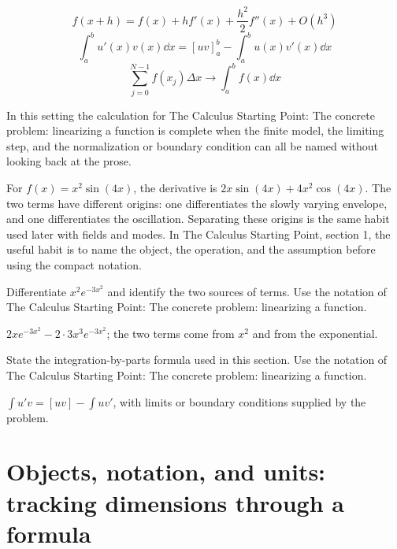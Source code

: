 \[
  f(x+h)=f(x)+hf'(x)+\frac{h^2}{2}f''(x)+O(h^3)
\]
\[
  \int_a^b u'(x)v(x)\dd x=[uv]_a^b-\int_a^b u(x)v'(x)\dd x
\]
\[
  \sum_{j=0}^{N-1}f(x_j)\Delta x\longrightarrow \int_a^b f(x)\dd x
\]

In this setting the calculation for The Calculus Starting Point: The concrete problem: linearizing a function is complete when the finite model, the limiting step, and the normalization or boundary condition can all be named without looking back at the prose.




\begin{example}
For \(f(x)=x^2\sin(4x)\), the derivative is \(2x\sin(4x)+4x^2\cos(4x)\).  The two terms have different origins: one differentiates the slowly varying envelope, and one differentiates the oscillation.  Separating these origins is the same habit used later with fields and modes.  In The Calculus Starting Point, section 1, the useful habit is to name the object, the operation, and the assumption before using the compact notation.
\end{example}



\begin{exercise}
Differentiate \(x^2e^{-3x^2}\) and identify the two sources of terms.  Use the notation of The Calculus Starting Point: The concrete problem: linearizing a function.
\begin{answer}
\(2xe^{-3x^2}-2\cdot 3x^3e^{-3x^2}\); the two terms come from \(x^2\) and from the exponential.
\end{answer}
\end{exercise}

\begin{exercise}
State the integration-by-parts formula used in this section.  Use the notation of The Calculus Starting Point: The concrete problem: linearizing a function.
\begin{answer}
\(\int u'v=[uv]-\int uv'\), with limits or boundary conditions supplied by the problem.
\end{answer}
\end{exercise}



\section{Objects, notation, and units: tracking dimensions through a formula}

